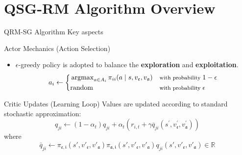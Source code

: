 \documentclass[10pt, aspectratio=169]{beamer}
\newcommand{\evidenzia}[1]{\textcolor{verdeSalvia}{\textbf{#1}}}
\begin{document}
\section{QSG-RM Algorithm Overview}

\begin{frame}{QRM-SG Algorithm Key aspects}
    \begin{block}{Actor Mechanics (Action Selection)}
        \begin{itemize}
            \item $\epsilon$-greedy policy is adopted to balance the \evidenzia{exploration} and \evidenzia{exploitation}.
            {
            $$a_i \leftarrow 
            \left\{
                \begin{aligned}
                &\operatorname{argmax}_{a\in A_i} \pi_{ii}(a \mid s, v_\mathfrak{e}, v_\mathfrak{a}) && {\footnotesize\text{with probability } 1-\epsilon} \\
                &\text{random} && {\footnotesize\text{with probability } \epsilon}\\
            \end{aligned}
            \right.
            $$
            }
        \end{itemize}
    \end{block}
    \vspace{0.2cm}
    
    \begin{block}{Critic Updates (Learning Loop)}
        Values are updated according to standard stochastic approximation:
        \[ q_{ji} \leftarrow (1-\alpha_{t})q_{ji} + \alpha_{t}(r_{i,t} + \gamma \overline{q}_{ji}(s^{\prime}, v_{\mathfrak{e}}^{\prime}, v_{\mathfrak{a}}^{\prime})) \]
        where %
        \[ \bar q_{ji} \leftarrow \pi_{\mathfrak{e},\mathfrak{i}}(s', v'_\mathfrak{e}, v'_\mathfrak{a} )  \pi_{\mathfrak{a},\mathfrak{i}}(s', v'_\mathfrak{e}, v'_\mathfrak{a} )  q_{ji} (s', v'_\mathfrak{e}, v'_\mathfrak{a} ) \in \mathbb{R}\]
    \end{block}
\end{frame}
\end{document}
